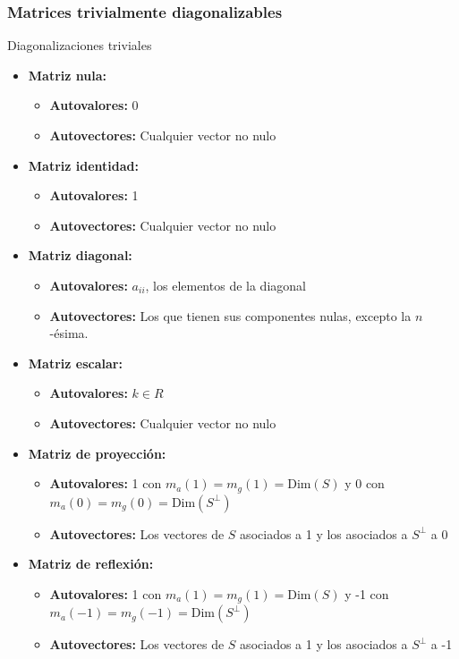 \documentclass[a4paper, twoside]{article}
\numberwithin{equation}{section}
\numberwithin{figure}{section}
\numberwithin{table}{section}
\newcommand{\dime}[1]{\text{Dim}(#1)}
\begin{document}
\subsubsection{Matrices trivialmente diagonalizables}
\begin{definicion*}{Diagonalizaciones triviales}
	\begin{itemize}
		\item \textbf{Matriz nula:}
			\begin{itemize}
				\item \textbf{Autovalores:} 0
				\item \textbf{Autovectores:} Cualquier vector no nulo
			\end{itemize}
		\item \textbf{Matriz identidad:}
			\begin{itemize}
				\item \textbf{Autovalores:} 1
				\item \textbf{Autovectores:} Cualquier vector no nulo
			\end{itemize}
		\item \textbf{Matriz diagonal:}
			\begin{itemize}
				\item \textbf{Autovalores:} $a_{ii}$, los elementos de la diagonal
				\item \textbf{Autovectores:} Los que tienen sus componentes nulas, excepto la $n$-ésima.
			\end{itemize}
		\item \textbf{Matriz escalar:}
			\begin{itemize}
				\item \textbf{Autovalores:} $k \in R$
				\item \textbf{Autovectores:} Cualquier vector no nulo
			\end{itemize}
		\item \textbf{Matriz de proyección:}
			\begin{itemize}
				\item \textbf{Autovalores:} 1 con $m_a(1)=m_g(1)=\dime{S}$ y 0 con $m_a(0)=m_g(0)=\dime{S^\bot}$
				\item \textbf{Autovectores:} Los vectores de $S$ asociados a 1 y los asociados a $S^\bot$ a 0
			\end{itemize}
		\item \textbf{Matriz de reflexión:}
			\begin{itemize}
				\item \textbf{Autovalores:} 1 con $m_a(1)=m_g(1)=\dime{S}$ y -1 con $m_a(-1)=m_g(-1)=\dime{S^\bot}$
				\item \textbf{Autovectores:} Los vectores de $S$ asociados a 1 y los asociados a $S^\bot$ a -1
			\end{itemize}
	\end{itemize}
\end{definicion*}
\end{document}
